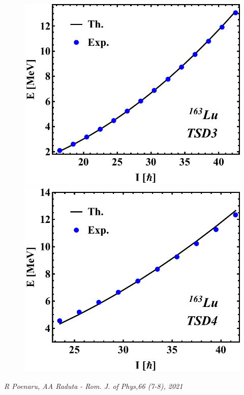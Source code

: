 \documentclass{beamer}
\begin{document}
\begin{frame}
\begin{figure}
\begin{minipage}{.5\textwidth}
     \includegraphics[scale=0.3]{figs/DoubleShift_TSD3.pdf}
     \includegraphics[scale=0.3]{figs/DoubleShift_TSD4.pdf}
    \end{minipage}
    \end{figure}
    \tiny{\emph{R Poenaru, AA Raduta - Rom. J. of Phys,66 (7-8), 2021}}
\end{frame}
\end{document}
